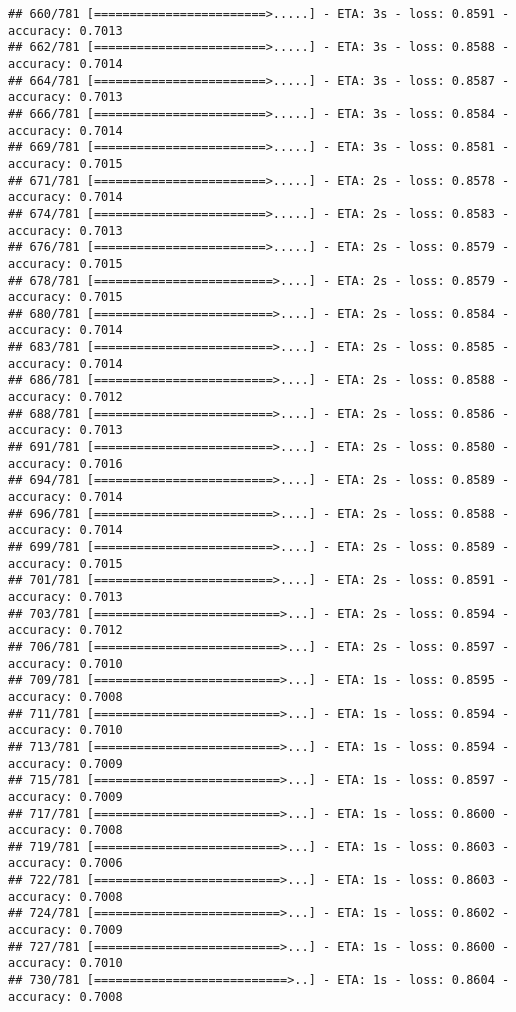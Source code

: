 \documentclass[
]{article}
\begin{document}
\begin{verbatim}
## 660/781 [========================>.....] - ETA: 3s - loss: 0.8591 - accuracy: 0.7013
## 662/781 [========================>.....] - ETA: 3s - loss: 0.8588 - accuracy: 0.7014
## 664/781 [========================>.....] - ETA: 3s - loss: 0.8587 - accuracy: 0.7013
## 666/781 [========================>.....] - ETA: 3s - loss: 0.8584 - accuracy: 0.7014
## 669/781 [========================>.....] - ETA: 3s - loss: 0.8581 - accuracy: 0.7015
## 671/781 [========================>.....] - ETA: 2s - loss: 0.8578 - accuracy: 0.7014
## 674/781 [========================>.....] - ETA: 2s - loss: 0.8583 - accuracy: 0.7013
## 676/781 [========================>.....] - ETA: 2s - loss: 0.8579 - accuracy: 0.7015
## 678/781 [=========================>....] - ETA: 2s - loss: 0.8579 - accuracy: 0.7015
## 680/781 [=========================>....] - ETA: 2s - loss: 0.8584 - accuracy: 0.7014
## 683/781 [=========================>....] - ETA: 2s - loss: 0.8585 - accuracy: 0.7014
## 686/781 [=========================>....] - ETA: 2s - loss: 0.8588 - accuracy: 0.7012
## 688/781 [=========================>....] - ETA: 2s - loss: 0.8586 - accuracy: 0.7013
## 691/781 [=========================>....] - ETA: 2s - loss: 0.8580 - accuracy: 0.7016
## 694/781 [=========================>....] - ETA: 2s - loss: 0.8589 - accuracy: 0.7014
## 696/781 [=========================>....] - ETA: 2s - loss: 0.8588 - accuracy: 0.7014
## 699/781 [=========================>....] - ETA: 2s - loss: 0.8589 - accuracy: 0.7015
## 701/781 [=========================>....] - ETA: 2s - loss: 0.8591 - accuracy: 0.7013
## 703/781 [==========================>...] - ETA: 2s - loss: 0.8594 - accuracy: 0.7012
## 706/781 [==========================>...] - ETA: 2s - loss: 0.8597 - accuracy: 0.7010
## 709/781 [==========================>...] - ETA: 1s - loss: 0.8595 - accuracy: 0.7008
## 711/781 [==========================>...] - ETA: 1s - loss: 0.8594 - accuracy: 0.7010
## 713/781 [==========================>...] - ETA: 1s - loss: 0.8594 - accuracy: 0.7009
## 715/781 [==========================>...] - ETA: 1s - loss: 0.8597 - accuracy: 0.7009
## 717/781 [==========================>...] - ETA: 1s - loss: 0.8600 - accuracy: 0.7008
## 719/781 [==========================>...] - ETA: 1s - loss: 0.8603 - accuracy: 0.7006
## 722/781 [==========================>...] - ETA: 1s - loss: 0.8603 - accuracy: 0.7008
## 724/781 [==========================>...] - ETA: 1s - loss: 0.8602 - accuracy: 0.7009
## 727/781 [==========================>...] - ETA: 1s - loss: 0.8600 - accuracy: 0.7010
## 730/781 [===========================>..] - ETA: 1s - loss: 0.8604 - accuracy: 0.7008

\end{verbatim}
\end{document}
